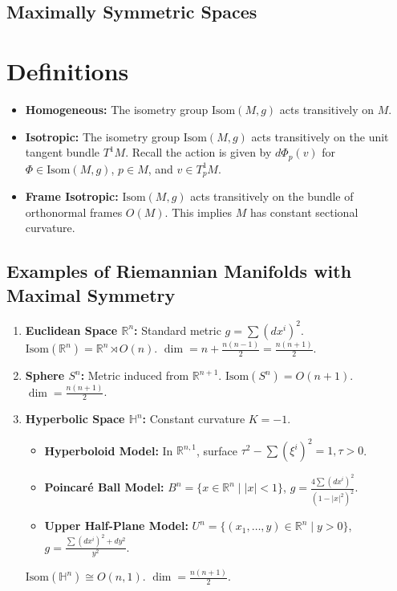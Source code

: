 \documentclass[11pt, a4paper]{article}
\theoremstyle{plain}
\theoremstyle{definition}
\theoremstyle{remark}
\begin{document}
\subsection{Maximally Symmetric Spaces}

\section*{Definitions}
\begin{itemize}
    \item \textbf{Homogeneous:} The isometry group $\text{Isom}(M, g)$ acts transitively on $M$.
    \item \textbf{Isotropic:} The isometry group $\text{Isom}(M, g)$ acts transitively on the unit tangent bundle $T^1 M$. Recall the action is given by $d\Phi_p(v)$ for $\Phi \in \text{Isom}(M, g)$, $p \in M$, and $v \in T_p^1 M$.
    \item \textbf{Frame Isotropic:} $\text{Isom}(M, g)$ acts transitively on the bundle of orthonormal frames $O(M)$. This implies $M$ has constant sectional curvature.
\end{itemize}

\subsection{Examples of Riemannian Manifolds with Maximal Symmetry}
\begin{enumerate}
    \item \textbf{Euclidean Space $\mathbb{R}^n$:} Standard metric $g = \sum (dx^i)^2$. $\text{Isom}(\mathbb{R}^n) = \mathbb{R}^n \rtimes O(n)$. $\dim = n + \frac{n(n-1)}{2} = \frac{n(n+1)}{2}$.
    \item \textbf{Sphere $S^n$:} Metric induced from $\mathbb{R}^{n+1}$. $\text{Isom}(S^n) = O(n+1)$. $\dim = \frac{n(n+1)}{2}$.
    \item \textbf{Hyperbolic Space $\mathbb{H}^n$:} Constant curvature $K = -1$.
    \begin{itemize}
        \item \textbf{Hyperboloid Model:} In $\mathbb{R}^{n,1}$, surface $\tau^2 - \sum (\xi^i)^2 = 1, \tau > 0$.
        \item \textbf{Poincaré Ball Model:} $B^n = \{x \in \mathbb{R}^n \mid |x| < 1\}$, $g = \frac{4 \sum (dx^i)^2}{(1-|x|^2)^2}$.
        \item \textbf{Upper Half-Plane Model:} $U^n = \{(x_1, \dots, y) \in \mathbb{R}^n \mid y > 0\}$, $g = \frac{\sum (dx^i)^2 + dy^2}{y^2}$.
    \end{itemize}
    $\text{Isom}(\mathbb{H}^n) \cong O(n, 1)$. $\dim = \frac{n(n+1)}{2}$.
\end{enumerate}
\newpage
\end{document}
